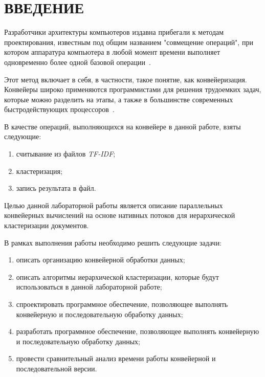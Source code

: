 \chapter*{ВВЕДЕНИЕ}


Разработчики архитектуры компьютеров издавна прибегали к методам проектирования, известным под общим названием "совмещение операций", при котором аппаратура компьютера в любой момент времени выполняет одновременно более одной базовой операции~\cite{conveyor}.

Этот метод включает в себя, в частности, такое понятие, как конвейеризация.
Конвейеры широко применяются программистами для решения трудоемких задач, которые можно разделить на этапы, а также в большинстве современных быстродействующих процессоров~\cite{conveyor}.

В качестве операций, выполняющихся на конвейере в данной работе, взяты следующие:
\begin{enumerate}
	\item считывание из файлов \textit{TF-IDF};
	\item кластеризация;
	\item запись результата в файл.
\end{enumerate}

Целью данной лабораторной работы является описание параллельных конвейерных вычислений на основе нативных потоков для иерархической кластеризации документов.

В рамках выполнения работы необходимо решить следующие задачи: 
\begin{enumerate}
	\item описать организацию конвейерной обработки данных;
	\item описать алгоритмы иерархической кластеризации, которые будут использоваться в данной лабораторной работе;
	\item спроектировать программное обеспечение, позволяющее выполнять конвейерную и последовательную обработку данных;
	\item разработать программное обеспечение, позволяющее выполнять конвейерную и последовательную обработку данных;
	\item провести сравнительный анализ времени работы конвейерной и последовательной версии.
\end{enumerate} 
